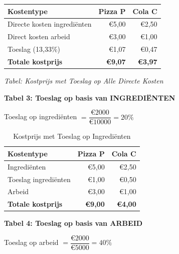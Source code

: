 \documentclass[a4paper,11pt]{article}
\begin{document}
\begin{center}
    \begin{tabular}{|l|r|r|}
        \hline
        \textbf{Kostentype}         & \textbf{Pizza P} & \textbf{Cola C} \\
        \hline
        Directe kosten ingrediënten & €5,00            & €2,50           \\
        Direct kosten arbeid        & €3,00            & €1,00           \\
        Toeslag (13,33\%)           & €1,07            & €0,47           \\
        \hline
        \textbf{Totale kostprijs}   & \textbf{€9,07}   & \textbf{€3,97}  \\
        \hline
    \end{tabular}
\end{center}
\label{tab:toeslag_alle_directe_kosten}
\begin{center}\small\emph{Tabel: Kostprijs met Toeslag op Alle Directe Kosten}\end{center}

\textbf{Tabel 3: Toeslag op basis van INGREDIËNTEN}

Toeslag op ingrediënten $= \dfrac{\text{€}2000}{\text{€}10000} = 20\%$
\newline

\begin{table}[ht]
    \centering
    \begin{tabular}{|l|r|r|}
        \hline
        \textbf{Kostentype}       & \textbf{Pizza P} & \textbf{Cola C} \\
        \hline
        Ingrediënten              & €5,00            & €2,50           \\
        Toeslag ingrediënten      & €1,00            & €0,50           \\
        Arbeid                    & €3,00            & €1,00           \\
        \hline
        \textbf{Totale kostprijs} & \textbf{€9,00}   & \textbf{€4,00}  \\
        \hline
    \end{tabular}
    \caption{Kostprijs met Toeslag op Ingrediënten}
\end{table}

\textbf{Tabel 4: Toeslag op basis van ARBEID}

Toeslag op arbeid $= \dfrac{\text{€}2000}{\text{€}5000} = 40\%$
\end{document}
